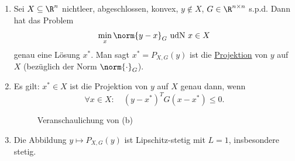 \begin{satz}[Projektionen]
\label{thm:projektionssatz}
	\begin{enumerate}[label=(\alph{enumi})]
		\item Sei $X \subseteq \R^{n}$ nichtleer, abgeschlossen, konvex, $y \not \in X$, $G \in \R^{n \times n}$ s.p.d. Dann hat das Problem 
		\[
		\min\limits_{x}\norm{y-x} _{G} \text{ udN } x \in X
		\] 
		genau eine Lösung ${x}^{*}$. Man sagt ${x}^{*}=P_{X,G}(y)$ ist die \underline{Projektion} von $y$ auf $X$ (bezüglich der Norm $\norm{\cdot} _{G}$).
		\item Es gilt: ${x}^{*} \in X$ ist die Projektion von $y$ auf $X$ genau dann, wenn
			\[
				\forall x \in X: \quad (y-{x}^{*})^{T}G(x-{x}^{*}) \leq 0
			.\] 
			\begin{figure}[H]
				\begin{center}
					
				\end{center}
				\caption{Veranschaulichung von (b)}
				\label{fig:projektionssatzbild}
			\end{figure}
			
		\item Die Abbildung $y \mapsto P_{X,G}(y)$ ist Lipschitz-stetig mit $L = 1$, insbesondere stetig.
	\end{enumerate}
\end{satz}


